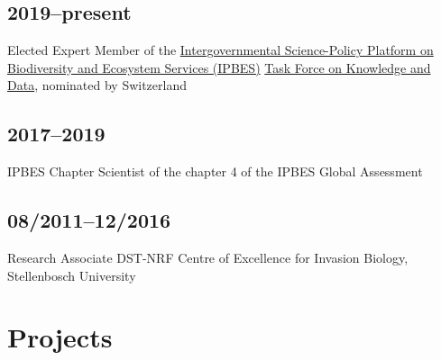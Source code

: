\documentclass[a4paper]{article}
\begin{document}
\subsection{2019--present}

Elected Expert Member of the \href{https://ipbes.net/}{Intergovernmental Science-Policy Platform on Biodiversity and Ecosystem Services (IPBES)} \href{https://ipbes.net/knowledge-data}{Task Force on Knowledge and Data}, nominated by Switzerland

\subsection{2017--2019}

IPBES Chapter Scientist of the chapter 4 of the IPBES Global Assessment

\subsection{08/2011--12/2016}

Research Associate DST-NRF Centre of Excellence for Invasion Biology, Stellenbosch University


\section{Projects}
\end{document}
